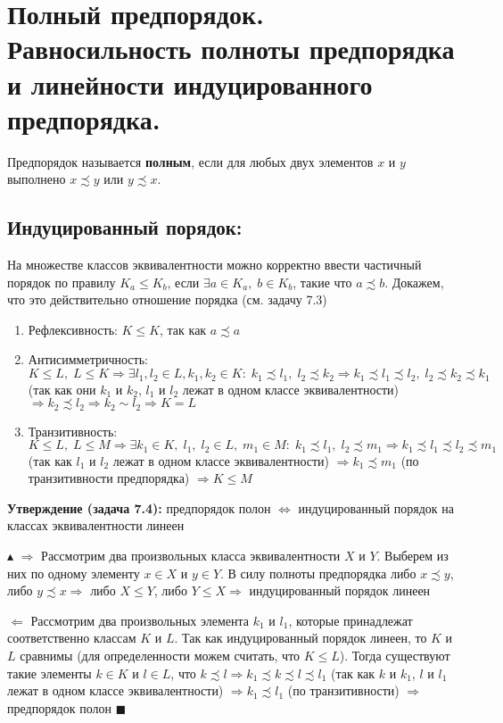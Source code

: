 \section{Полный предпорядок. Равносильность полноты предпорядка и линейности индуцированного предпорядка.}
\par Предпорядок называется \textbf{полным}, если для любых двух элементов $x$ и $y$ выполнено $x \precsim y$ или $y \precsim x$.
\subsection*{Индуцированный порядок:}
\par На множестве классов эквивалентности можно корректно ввести частичный порядок по правилу $K_a \leq K_b$, если $\exists a \in K_a, \; b \in K_b$, такие что $a \precsim b$. Докажем, что это действительно отношение порядка (см. задачу 7.3)
\begin{enumerate}
    \item Рефлексивность: $K \leq K$, так как $a \precsim a$
    \item Антисимметричность: $K \leq L, \; L \leq K \Rightarrow \exists l_1, l_2 \in L, k_1, k_2 \in K: \; k_1 \precsim l_1, \; l_2 \precsim k_2 \Rightarrow k_1 \precsim l_1 \precsim l_2, \; l_2 \precsim k_2 \precsim k_1$ (так как они $k_1$ и $k_2$, $l_1$ и $l_2$ лежат в одном классе эквивалентности) $\Rightarrow k_2 \precsim l_2 \Rightarrow k_2 \sim l_2 \Rightarrow K=L$
    \item Транзитивность: $K \leq L, \; L \leq M \Rightarrow \exists k_1 \in K, \; l_1, \; l_2 \in L, \; m_1 \in M: \; k_1 \precsim l_1, \; l_2 \precsim m_1 \Rightarrow k_1 \precsim l_1 \precsim l_2 \precsim m_1$ (так как $l_1$ и $l_2$ лежат в одном классе эквивалентности) $\Rightarrow k_1 \precsim m_1$ (по транзитивности предпорядка) $\Rightarrow K \leq M$
\end{enumerate}
\par \textbf{Утверждение (задача 7.4):} предпорядок полон $\Leftrightarrow$ индуцированный порядок на классах эквивалентности линеен
\par $\blacktriangle$ $\Rightarrow$ Рассмотрим два произвольных класса эквивалентности $X$ и $Y$. Выберем из них по одному элементу $x \in X$ и $y \in Y$. В силу полноты предпорядка либо $x \precsim y$, либо $y \precsim x \Rightarrow$ либо $X \leq Y$, либо $Y \leq X \Rightarrow$ индуцированный порядок линеен 
\par $\Leftarrow$ Рассмотрим два произвольных элемента $k_1$ и $l_1$, которые принадлежат соответственно классам $K$ и $L$. Так как индуцированный порядок линеен, то $K$ и $L$ сравнимы (для определенности можем считать, что $K \leq L$). Тогда существуют такие элементы $k \in K$ и $l \in L$, что $k \precsim l \Rightarrow k_1 \precsim k \precsim l \precsim l_1$ (так как $k$ и $k_1$, $l$ и $l_1$ лежат в одном классе эквивалентности) $\Rightarrow k_1 \precsim l_1$ (по транзитивности) $\Rightarrow$ предпорядок полон $\blacksquare$
